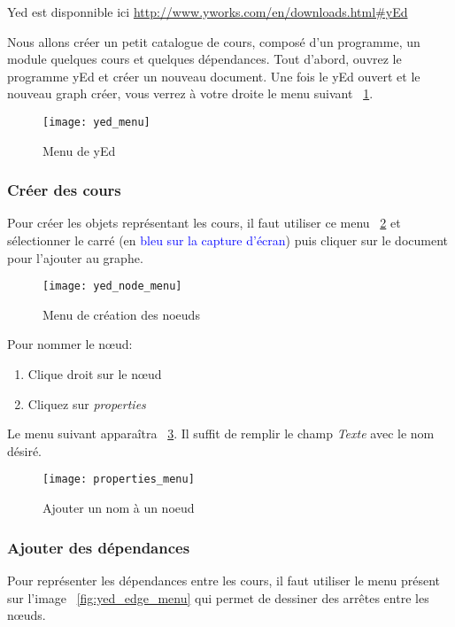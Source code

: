 Yed est disponnible ici \url{http://www.yworks.com/en/downloads.html\#yEd}

Nous allons créer un petit catalogue de cours, composé d'un programme, un module quelques cours et quelques dépendances. Tout d'abord, ouvrez le programme yEd et créer un nouveau document. Une fois le yEd ouvert et le nouveau graph créer, vous verrez à votre droite le menu suivant ~\ref{fig:yed_menu}.

\begin{figure}[H]
\centering
\caption{Menu de yEd}
\label{fig:yed_menu}
\texttt{[image: yed\_menu]}
\end{figure}


\subsubsection{Créer des cours}
Pour créer les objets représentant les cours, il faut utiliser ce menu ~\ref{fig:yed_node_menu} et sélectionner le carré (en \textcolor{blue}{bleu sur la capture d'écran}) puis cliquer sur le document pour l'ajouter au graphe.

\begin{figure}[H]
\centering
\caption{Menu de création des noeuds}
\label{fig:yed_node_menu}
\texttt{[image: yed\_node\_menu]}
\end{figure}

Pour nommer le nœud:
\begin{enumerate}
\item Clique droit sur le nœud
\item Cliquez sur \textit{properties}
\end{enumerate}

Le menu suivant apparaîtra ~\ref{fig:properties_menu}. Il suffit de remplir le champ \textit{Texte} avec le nom désiré.

\begin{figure}[H]
\centering
\caption{Ajouter un nom à un noeud}
\label{fig:properties_menu}
\texttt{[image: properties\_menu]}
\end{figure}


\subsubsection{Ajouter des dépendances}

Pour représenter les dépendances entre les cours, il faut utiliser le menu présent sur l'image  ~\ref{fig:yed_edge_menu} qui permet de dessiner des arrêtes entre les nœuds.

